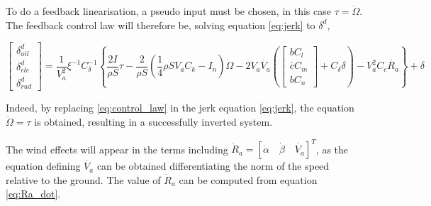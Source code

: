 To do a feedback linearisation, a pseudo input must be chosen, in this case $\tau = \ddot{\Omega}$. The feedback control law will therefore be, solving equation \ref{eq:jerk} to $\delta^d$,

\begin{equation}
\begin{bmatrix}
\delta^d_{ail}\\
\delta^d_{ele}\\
\delta^d_{rud}
\end{bmatrix}
=\dfrac{1}{V_a^2}\xi^{-1}C_\delta^{-1}\left\lbrace\dfrac{2I}{\rho S}\tau - \dfrac{2}{\rho S}(\dfrac{1}{4}\rho S V_aC_k - I_n)\dot{\Omega} -2V_a\dot{V_a} \left(
\begin{bmatrix}
bC_l\\
\bar{c}C_m\\
bC_n
\end{bmatrix}
+ C_\delta \delta\right)-V_a^2C_c\dot{R_a} \right\rbrace+ \delta
\label{eq:control_law}
\end{equation}


Indeed, by replacing \ref{eq:control_law} in the jerk equation \ref{eq:jerk}, the equation $\ddot{\Omega} = \tau$ is obtained, resulting in a successfully inverted system.


The wind effects will appear in the terms including $\dot{R}_a =  [\dot{\alpha} \quad \dot{\beta} \quad \dot{V_a}]^T$, as the equation defining $\dot{V_a}$ can be obtained differentiating the norm of the speed relative to the ground. The value of $\dot{R}_a$ can be computed from equation \ref{eq:Ra_dot}.

